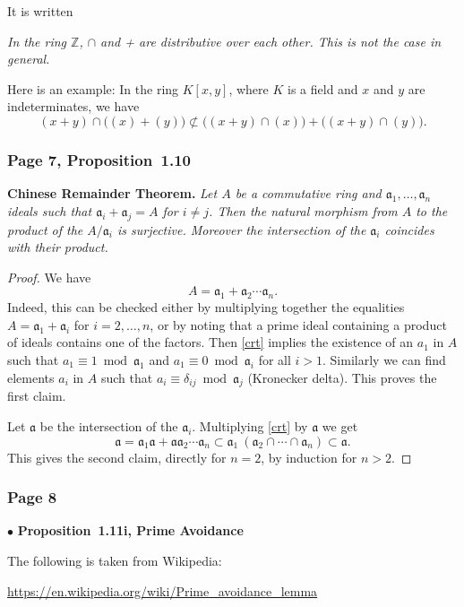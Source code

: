 \documentclass[12pt,letterpaper]{article}%
\newcommand{\mf}{\mathfrak}
\newcommand{\aaa}{\mf a}
\newcommand{\bu}{\bullet}
\newcommand{\nn}{\noindent}
\begin{document}
It is written

\nn\emph{In the ring $\mathbb Z$, $\cap$ and + are distributive over each other. This is not the case in general.}

Here is an example: In the ring $K[x,y]$, where $K$ is a field and $x$ and $y$ are indeterminates, we have 
$$
(x+y)\cap\Big((x)+(y)\Big)\not\subset\Big((x+y)\cap (x)\Big)+\Big((x+y)\cap (y)\Big).
$$

\subsubsection{Page 7, Proposition~1.10}%

\nn\textbf{Chinese Remainder Theorem.} \emph{Let $A$ be a commutative ring and $\aaa_1,\dots,\aaa_n$ ideals such that $\aaa_i+\aaa_j=A$ for $i\not=j$. Then the natural morphism from $A$ to the product of the $A/\aaa_i$ is surjective. Moreover the intersection of the $\aaa_i$ coincides with their product.}

\begin{proof} 
We have
\begin{equation}\label{crt}
A=\aaa_1+\aaa_2\cdots\aaa_n.
\end{equation}
Indeed, this can be checked either by multiplying together the equalities $A=\aaa_1+\aaa_i$ for $i=2,\dots,n$, or by noting that a prime ideal containing a product of ideals contains one of the factors. Then \eqref{crt} implies the existence of an $a_1$ in $A$ such that $a_1\equiv1\bmod\aaa_1$ and $a_1\equiv0\bmod \aaa_i$ for all $i>1$. Similarly we can find elements $a_i$ in $A$ such that $a_i\equiv\delta_{ij}\bmod \aaa_j$ (Kronecker delta). This proves the first claim.

Let $\aaa$ be the intersection of the $\aaa_i$. Multiplying \eqref{crt} by $\aaa$ we get
$$
\aaa=
\aaa_1\aaa+
\aaa\aaa_2\cdots\aaa_n\subset
\aaa_1\ (\aaa_2\cap\cdots \cap \aaa_n)\subset \aaa.
$$
This gives the second claim, directly for $n=2$, by induction for $n>2$. 
\end{proof}

\subsubsection{Page 8}%

\nn$\bu$ \textbf{Proposition~1.11i, Prime Avoidance}

The following is taken from Wikipedia:

\href{https://en.wikipedia.org/wiki/Prime_avoidance_lemma}{https://en.wikipedia.org/wiki/Prime\_avoidance\_lemma}
\end{document}
